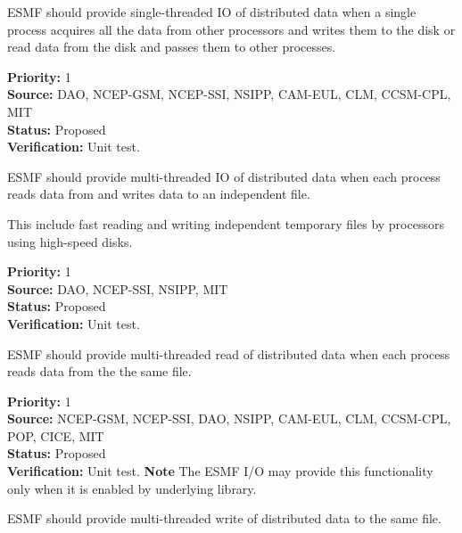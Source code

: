 


ESMF should provide single-threaded IO of distributed data when a
single process acquires all the data from other processors and writes
them to the disk or read data from the disk and passes them to other 
processes. 


\begin{reqlist}
{\bf Priority:} 1 \\
{\bf Source:} DAO, NCEP-GSM, NCEP-SSI, NSIPP, CAM-EUL, CLM, CCSM-CPL, MIT \\
{\bf Status:} Proposed \\
{\bf Verification:} Unit test.
\end{reqlist}




ESMF should provide multi-threaded IO of distributed data when each
process reads data from and writes data to an independent file. 

This include fast reading and writing independent temporary files by 
processors using high-speed disks.

\begin{reqlist}
{\bf Priority:} 1 \\
{\bf Source:} DAO, NCEP-SSI, NSIPP, MIT \\
{\bf Status:} Proposed \\
{\bf Verification:} Unit test.
\end{reqlist}




ESMF should provide multi-threaded read of distributed data when each
process reads data from the the same file.  

\begin{reqlist}
{\bf Priority:} 1 \\
{\bf Source:} NCEP-GSM, NCEP-SSI, DAO, NSIPP, CAM-EUL, CLM, CCSM-CPL, POP, CICE, MIT \\
{\bf Status:} Proposed \\
{\bf Verification:} Unit test.
{\bf Note} The ESMF I/O may provide this functionality only when it is 
enabled by underlying library. 
\end{reqlist}




ESMF should provide multi-threaded write of distributed data to the same 
file.  

